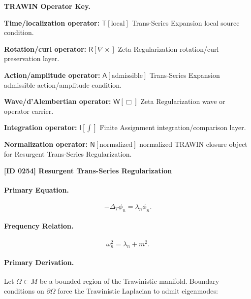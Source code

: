 \par\vspace{0.45\baselineskip}
\noindent\begin{minipage}[t]{\linewidth}
\begingroup
\small
\raggedright
\textbf{TRAWIN Operator Key.}\par
\noindent\textbf{Time/localization operator:} $\mathsf{T}\!\left[\mathrm{local}\right]$ Trans-Series Expansion local source condition.\par
\noindent\textbf{Rotation/curl operator:} $\mathsf{R}\!\left[\nabla\times\right]$ Zeta Regularization rotation/curl preservation layer.\par
\noindent\textbf{Action/amplitude operator:} $\mathsf{A}\!\left[\mathrm{admissible}\right]$ Trans-Series Expansion admissible action/amplitude condition.\par
\noindent\textbf{Wave/d'Alembertian operator:} $\mathsf{W}\!\left[\Box\right]$ Zeta Regularization wave or operator carrier.\par
\noindent\textbf{Integration operator:} $\mathsf{I}\!\left[\int\right]$ Finite Assignment integration/comparison layer.\par
\noindent\textbf{Normalization operator:} $\mathsf{N}\!\left[\mathrm{normalized}\right]$ normalized TRAWIN closure object for Resurgent Trans-Series Regularization.\par
\endgroup
\end{minipage}

\clearpage
\noindent\textbf{[ID 0254] Resurgent Trans-Series Regularization}\par
\vspace{0.35em}
\paragraph{Primary Equation.}
\begin{equation}
-\Delta_T \phi_n = \lambda_n \phi_n .
\end{equation}

\paragraph{Frequency Relation.}
\begin{equation}
\omega_n^2 = \lambda_n + m^2 .
\end{equation}

\paragraph{Primary Derivation.}
Let $\Omega\subset M$ be a bounded region of the Trawinistic manifold.  
Boundary conditions on $\partial\Omega$ force the Trawinistic Laplacian to admit eigenmodes:

